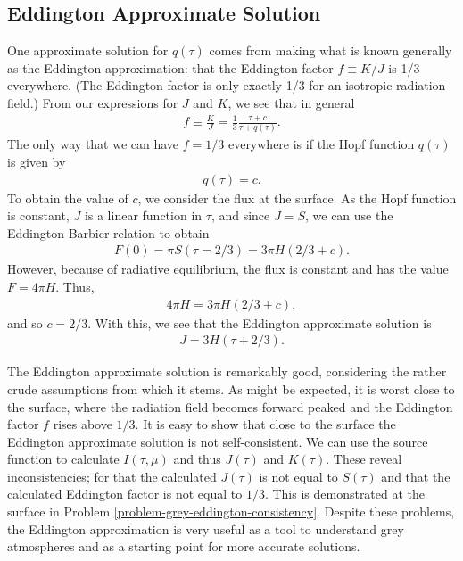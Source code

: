 \newslide

\subsection{Eddington Approximate Solution}

One approximate solution for $q(\tau)$ comes from making
what is known generally as the Eddington approximation: that
the Eddington factor $f \equiv K/J$ is 1/3 everywhere. (The
Eddington factor is only exactly 1/3 for an isotropic
radiation field.) 
From our expressions for $J$ and $K$, we see that in general
\begin{align}
f \equiv \frac{K}{J} = \frac{1}{3} \frac{\tau + c}{\tau + q(\tau)}.
\end{align}
The only way that we can have $f = 1/3$ everywhere is if the
Hopf function $q(\tau)$ is given by
\begin{align}
q(\tau) = c.
\end{align}
To obtain the value of $c$, we consider the flux at the
surface. As the Hopf function is constant, $J$ is a linear
function in $\tau$, and since $J = S$, we can use the
Eddington-Barbier relation to obtain
\begin{align}
F(0) = \pi S(\tau=2/3) = 3\pi H(2/3 + c).
\end{align}
However, because of radiative equilibrium, the flux is
constant and has the value $F = 4\pi H$.
Thus, 
\begin{align}
4\pi H = 3\pi H (2/3 + c),
\end{align}
and so $c = 2/3$. With this, we see that the Eddington approximate
solution is
\begin{align}
J = 3H(\tau + 2/3).
\end{align}

\newslide

The Eddington approximate solution is remarkably good, considering the
rather crude assumptions from which it stems. As might be expected, it
is worst close to the surface, where the radiation field becomes forward
peaked and the Eddington factor $f$ rises above $1/3$. It is easy to
show that close to the surface the Eddington approximate solution is not
self-consistent. We can use the source function to calculate
$I(\tau,\mu)$ and thus $J(\tau)$ and $K(\tau)$. These reveal
inconsistencies; for that the calculated $J(\tau)$ is not equal to
$S(\tau)$ and that the calculated Eddington factor is not equal to
$1/3$. This is demonstrated at the surface in Problem
\ref{problem-grey-eddington-consistency}. Despite these problems, the
Eddington approximation is very useful as a tool to understand grey
atmospheres and as a starting point for more accurate solutions.

